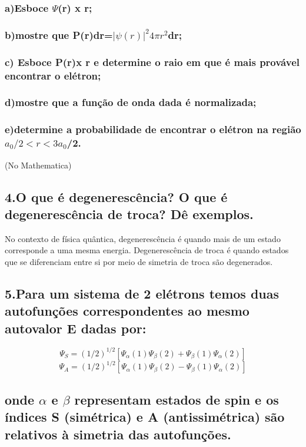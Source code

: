 \documentclass{article}
\begin{document}
\subsubsection{a)Esboce $\Psi$(r) x r;}

\subsubsection{b)mostre que P(r)dr=$|\psi(r)|^2 4 \pi r^2$dr; }
\subsubsection{c) Esboce P(r)x r e determine o raio em que é mais provável encontrar o elétron; }
\subsubsection{d)mostre que a função de onda dada é normalizada;}
\subsubsection{e)determine a probabilidade de encontrar o elétron na região $a_0/2<r<3a_0$/2.
}

(No Mathematica)

\subsection{4.O que é degenerescência? O que é degenerescência de troca? Dê exemplos.
}
No contexto de física quântica, degenerescência é quando mais de um estado corresponde a uma mesma energia. Degenerescência de troca é quando estados que se diferenciam entre si por meio de simetria de troca são degenerados. 
\subsection{5.Para um sistema de 2 elétrons temos duas autofunções correspondentes ao mesmo autovalor E dadas por:
}

\begin{equation}
\Psi_S= (1/2)^{1/2}[\Psi_{\alpha}(1)\Psi_{\beta}(2) + \Psi_{\beta}(1)\Psi_{\alpha}(2)]
\end{equation}
\begin{equation}
\Psi_A= (1/2)^{1/2}[\Psi_{\alpha}(1)\Psi_{\beta}(2) -\Psi_{\beta}(1)\Psi_{\alpha}(2)]
\end{equation}

\subsection{onde $\alpha$ e $\beta$ representam estados de spin e os índices S (simétrica) e A (antissimétrica) são relativos à simetria das autofunções.
}
\end{document}
